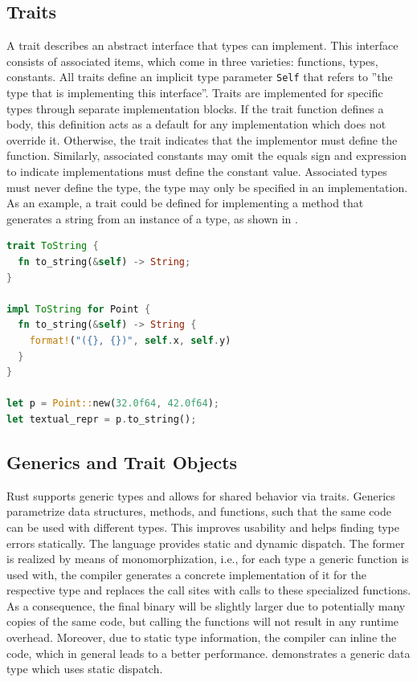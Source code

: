 \documentclass[paper=a4,%
  twoside,%
  BCOR4mm,%
  abstract=true,%
  toc=bibliography,%
  chapterprefix=true,%
  toc=bibliographynumbered,%
  open=right,%
  english,%
  pagesize=pdftex]{scrreprt}
\begin{document}
\subsection{Traits}
A trait describes an abstract interface that types can implement. This interface consists of associated items, which come in three varieties: functions, types, constants. All traits define an implicit type parameter \lstinline{Self} that refers to ''the type that is implementing this interface''. Traits are implemented for specific types through separate implementation blocks. If the trait function defines a body, this definition acts as a default for any implementation which does not override it. Otherwise, the trait indicates that the implementor must define the function. Similarly, associated constants may omit the equals sign and expression to indicate implementations must define the constant value. Associated types must never define the type, the type may only be specified in an implementation. As an example, a trait could be defined for implementing a method that generates a string from an instance of a type, as shown in .

\begin{lstlisting}[language=Rust, style=boxed, caption={Trait definition and implementation for the \lstinline{Point} data type from \Cref{lst:example-struct-enum}}, label=lst:example-trait]
trait ToString {
  fn to_string(&self) -> String;
}

impl ToString for Point {
  fn to_string(&self) -> String {
    format!("({}, {})", self.x, self.y)
  }
}

let p = Point::new(32.0f64, 42.0f64);
let textual_repr = p.to_string();
\end{lstlisting}


\subsection{Generics and Trait Objects}
Rust supports generic types and allows for shared behavior via traits. Generics parametrize data structures, methods, and functions, such that the same code can be used with different types. This improves usability and helps finding type errors statically. The language provides static and dynamic dispatch. The former is realized by means of monomorphization, i.e., for each type a generic function is used with, the compiler generates a concrete implementation of it for the respective type and replaces the call sites with calls to these specialized functions. As a consequence, the final binary will be slightly larger due to potentially many copies of the same code, but calling the functions will not result in any runtime overhead. Moreover, due to static type information, the compiler can inline the code, which in general leads to a better performance.  demonstrates a generic data type which uses static dispatch.
\end{document}

